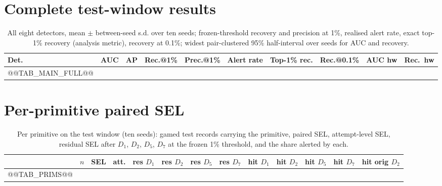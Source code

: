 \documentclass[conference]{IEEEtran}
\begin{document}
\section{Complete test-window results}
\begin{table}[t]\caption{All eight detectors, mean $\pm$ between-seed s.d. over ten seeds; frozen-threshold recovery and precision at 1\%, realised alert rate, exact top-1\% recovery (analysis metric), recovery at 0.1\%; widest pair-clustered 95\% half-interval over seeds for AUC and recovery.}\label{tab:full}\centering\scriptsize\setlength{\tabcolsep}{2.5pt}
\begin{tabular}{@{}lccccccccc@{}}\toprule
Det. & AUC & AP & Rec.@1\% & Prec.@1\% & Alert rate & Top-1\% rec. & Rec.@0.1\% & AUC hw & Rec.\ hw \\\midrule
@@TAB_MAIN_FULL@@
\bottomrule\end{tabular}\end{table}

\section{Per-primitive paired SEL}
\begin{table}[t]\caption{Per primitive on the test window (ten seeds): gamed test records carrying the primitive, paired SEL, attempt-level SEL, residual SEL after $D_1$, $D_2$, $D_5$, $D_7$ at the frozen 1\% threshold, and the share alerted by each.}\label{tab:prims}\centering\scriptsize\setlength{\tabcolsep}{2.5pt}
\begin{tabular}{@{}lcccccccccccc@{}}\toprule
 & $n$ & SEL & att. & res $D_1$ & res $D_2$ & res $D_5$ & res $D_7$ & hit $D_1$ & hit $D_2$ & hit $D_5$ & hit $D_7$ & hit orig $D_2$ \\\midrule
@@TAB_PRIMS@@
\bottomrule\end{tabular}\end{table}
\end{document}

